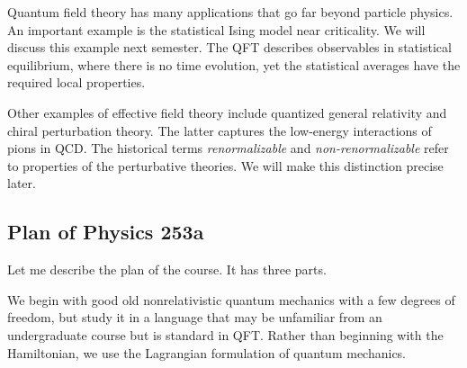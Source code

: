 Quantum field theory has many applications that go far beyond particle physics.
An important example is the statistical Ising model near criticality.
We will discuss this example next semester.
The QFT describes observables in statistical equilibrium, where there is no time
evolution, yet the statistical averages have the required local properties.

Other examples of effective field theory include quantized general relativity
and chiral perturbation theory. The latter
captures the low-energy interactions of pions in QCD.
The historical terms \emph{renormalizable} and \emph{non-renormalizable} refer
to properties of the perturbative theories. We will make this distinction
precise later.

\subsection{Plan of Physics 253a}
\label{sec:253a-plan}

Let me describe the plan of the course. It has three parts.

We begin with good old nonrelativistic quantum mechanics with a few degrees of
freedom, but study it in
a language that may be unfamiliar from an undergraduate course but is standard
in QFT. Rather than beginning with the Hamiltonian, we use
the Lagrangian formulation of quantum mechanics.

